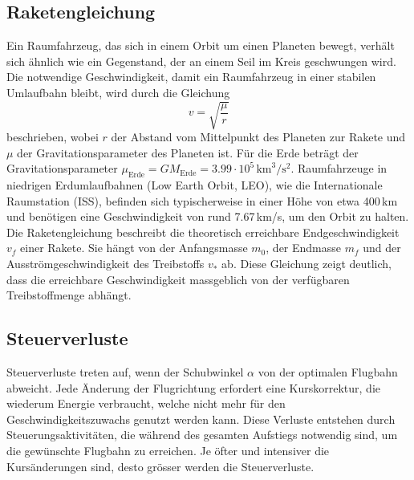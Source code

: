 \subsection{Raketengleichung \label{leo:section:raketengleichung}}
Ein Raumfahrzeug, das sich in einem Orbit um einen Planeten bewegt,
verhält sich ähnlich wie ein Gegenstand, der an einem Seil im Kreis
geschwungen wird.
Die notwendige Geschwindigkeit, damit ein Raumfahrzeug in einer
stabilen Umlaufbahn bleibt, wird durch die Gleichung
\[
v = \sqrt{\frac{\mu}{r}}
\]
beschrieben, wobei \(r\) der Abstand vom Mittelpunkt des Planeten zur Rakete und \(\mu\) der Gravitationsparameter des Planeten ist.
Für die Erde beträgt der Gravitationsparameter $\mu_{\text{Erde}} = GM_{\text{Erde}} = 3.99 \cdot 10^5\,\text{km}^3/\text{s}^2$. 
Raumfahrzeuge in niedrigen Erdumlaufbahnen (Low Earth Orbit, LEO), wie die Internationale Raumstation (ISS), befinden sich typischerweise in einer Höhe von etwa 400\,km und benötigen eine Geschwindigkeit von rund 7.67\,km/s, um den Orbit zu halten.
%
%
%
%
Die Raketengleichung beschreibt die theoretisch erreichbare Endgeschwindigkeit \(v_f\) einer Rakete. 
Sie hängt von der Anfangsmasse \(m_0\), der Endmasse \(m_f\) und der Ausströmgeschwindigkeit des Treibstoffs \(v_*\) ab. 
Diese Gleichung zeigt deutlich, dass die erreichbare Geschwindigkeit massgeblich von der verfügbaren Treibstoffmenge abhängt.

\subsection{Steuerverluste}
Steuerverluste treten auf, wenn der Schubwinkel \(\alpha\) von der optimalen Flugbahn abweicht. 
%
Jede Änderung der Flugrichtung erfordert eine Kurskorrektur, die wiederum Energie verbraucht, welche nicht mehr für den Geschwindigkeitszuwachs genutzt werden kann. 
Diese Verluste entstehen durch Steuerungsaktivitäten, die während des gesamten Aufstiegs notwendig sind, um die gewünschte Flugbahn zu erreichen. 
Je öfter und intensiver die Kursänderungen sind, desto grösser werden die Steuerverluste.

